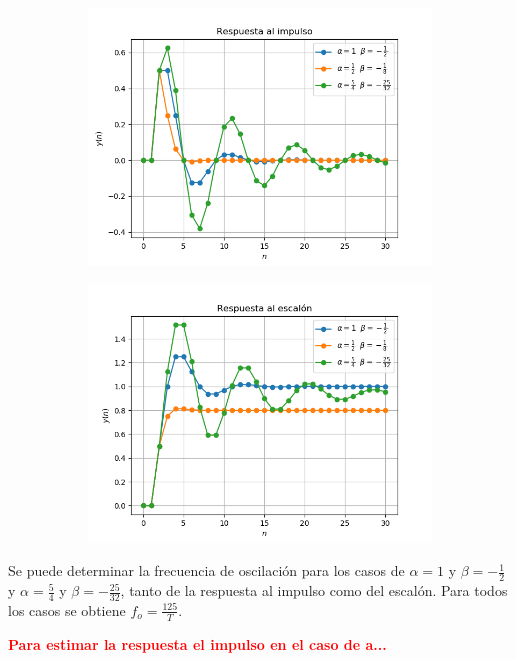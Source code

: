 \begin{figure}[H]
\centering
\begin{subfigure}{.49\textwidth}
\centering
	\includegraphics[width=\textwidth]{Imagenes/9-impulso.png}
\end{subfigure}
\begin{subfigure}{.49\textwidth}
\centering
	\includegraphics[width=\textwidth]{Imagenes/9-escalon.png}
\end{subfigure}
\end{figure}

Se puede determinar la frecuencia de oscilación para los casos de $\alpha = 1$ y $\beta = -\frac{1}{2}$ y $\alpha = \frac{5}{4}$ y $\beta = -\frac{25}{32}$, tanto de la respuesta al impulso como del escalón. Para todos los casos se obtiene $f_o = \frac{125}{T}$.
\begin{center}
	\textcolor{red}{\textbf{Para estimar la respuesta el impulso en el caso de a...}}
\end{center}

